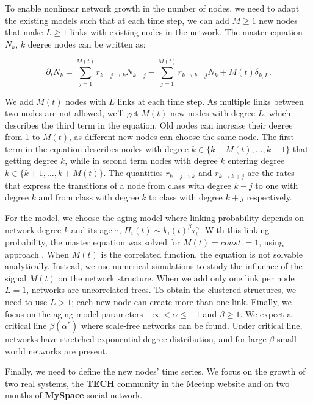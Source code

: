To enable nonlinear network growth in the number of nodes, we need to adapt the existing models such that at each time step, we can add $M\geq1$ new nodes that make $L\geq1$ links with existing nodes in the network. The master equation $N_k$, $k$ degree nodes can be written as: 

\begin{equation}
\partial_{t}N_{k}=\sum^{M(t)}_{j=1}r_{k-j\longrightarrow k}N_{k-j}-\sum^{M(t)}_{j=1}r_{k\longrightarrow k+j}N_{k}+M(t)\delta_{k,L} . \label{eq:aging_master}  
\end{equation}

We add $M(t)$ nodes with $L$ links at each time step. As multiple links between two nodes are not allowed, we'll get $M(t)$ new nodes with degree $L$, which describes the third term in the equation. Old nodes can increase their degree from 1 to $M(t)$, as different new nodes can choose the same node. The first term in the equation describes nodes with degree $k\in\{k-M(t),\ldots, k-1\}$ that getting degree $k$, while in second term nodes with degree $k$ entering degree  $k\in\{k+1,\ldots, k+M(t)\}$. The quantities $r_{k-j\longrightarrow k}$ and $r_{k\longrightarrow k+j}$ are the rates that express the transitions of a node from class with degree $k-j$ to one with degree $k$ and from class with degree $k$ to class with degree $k+j$ respectively.  

For the model, we choose the aging model where linking probability depends on network degree $k$ and its age $\tau$, $\Pi_{i}(t)\sim k_{i}(t)^{\beta}\tau_{i}^{\alpha}$. With this linking probability, the master equation was solved for $M(t)=const.=1$, using approach \cite{dorogovtsev2001b}. When $M(t)$ is the correlated function, the equation is not solvable analytically. Instead, we use numerical simulations to study the influence of the signal $M(t)$ on the network structure. When we add only one link per node $L=1$, networks are uncorrelated trees. To obtain the clustered structures, we need to use $L>1$; each new node can create more than one link. Finally, we focus on the aging model parameters $-\infty<\alpha\leq-1$ and $\beta\geq1$. We expect a critical line $\beta(\alpha^{*})$ where scale-free networks can be found. Under critical line, networks have stretched exponential degree distribution, and for large $\beta$ small-world networks are present. 

Finally, we need to define the new nodes' time series. We focus on the growth of two real systems, the \textbf{TECH} \cite{smiljanic2017associative} community in the Meetup website and on two months of \textbf{MySpace} \cite{suvakov2013} social network. 

